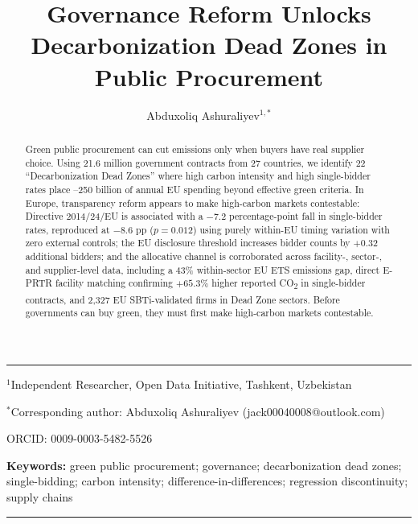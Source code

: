 \documentclass[11pt,a4paper]{article}
\title{\Large\textbf{Governance Reform Unlocks Decarbonization Dead Zones in Public Procurement}}
\author{Abduxoliq Ashuraliyev$^{1,*}$}
\date{}
\begin{document}
\maketitle

\vspace{-0.5cm}
\noindent\rule{\textwidth}{0.5pt}

\begin{center}
$^{1}$Independent Researcher, Open Data Initiative, Tashkent, Uzbekistan

$^{*}$Corresponding author: Abduxoliq Ashuraliyev (jack00040008@outlook.com)

ORCID: 0009-0003-5482-5526
\end{center}

\noindent\vspace{0.3cm}

\begin{abstract}
\noindent Green public procurement can cut emissions only when buyers have real supplier choice. Using 21.6 million government contracts from 27 countries, we identify 22 ``Decarbonization Dead Zones'' where high carbon intensity and high single-bidder rates place --250 billion of annual EU spending beyond effective green criteria. In Europe, transparency reform appears to make high-carbon markets contestable: Directive 2014/24/EU is associated with a $-7.2$ percentage-point fall in single-bidder rates, reproduced at $-8.6$ pp ($p = 0.012$) using purely within-EU timing variation with zero external controls; the EU disclosure threshold increases bidder counts by $+0.32$ additional bidders; and the allocative channel is corroborated across facility-, sector-, and supplier-level data, including a 43\% within-sector EU ETS emissions gap, direct E-PRTR facility matching confirming $+65.3\%$ higher reported CO\textsubscript{2} in single-bidder contracts, and 2,327 EU SBTi-validated firms in Dead Zone sectors. Before governments can buy green, they must first make high-carbon markets contestable.
\end{abstract}

\noindent\textbf{Keywords:} green public procurement; governance; decarbonization dead zones; single-bidding; carbon intensity; difference-in-differences; regression discontinuity; supply chains

\vspace{0.5cm}
\noindent\rule{\textwidth}{0.5pt}

\end{document}
